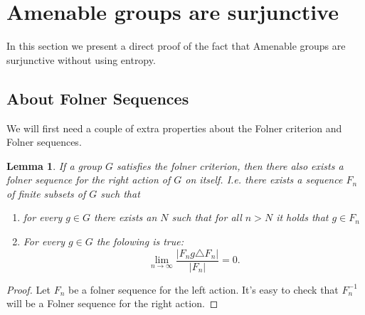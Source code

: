 \documentclass[titlepage, a4paper]{article}
\newcommand{\card}[1]{\left| #1 \right|}
\newtheorem{lemma}{Lemma}
\theoremstyle{remark}
\begin{document}
	
\section{Amenable groups are surjunctive}
In this section we present a direct proof of the fact that Amenable groups are surjunctive without using entropy.
\subsection{About Folner Sequences}
We will first need a couple of extra properties about the Folner criterion and Folner sequences.
\begin{lemma}\label{lem:right_folner_sequence}
	If a group $G$ satisfies the folner criterion, then there also exists a folner sequence for the right action of $G$ on itself. 
	I.e. there exists a sequence $F_n$ of finite subsets of $G$ such that 
		\begin{enumerate}
		\item for every $g \in G$ there exists an  $N$ such that for all $n >N$ it holds that $g \in F_n$ 
		\item For every $g \in G$ the folowing is true: \[
				\lim_{n \to \infty} \frac{\card{F_ng \triangle F_n}}{\card{F_n}} = 0
		.\] 
	\end{enumerate}
\end{lemma}
\begin{proof}
	Let $F_n$ be a folner sequence for the left action. 
	It's easy to check that $F_n^{-1}$ will be a Folner sequence for the right action. 
\end{proof}
\end{document}
